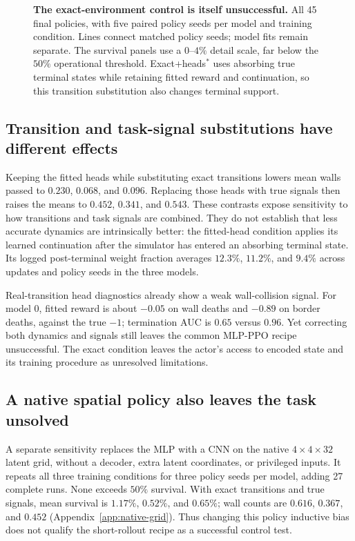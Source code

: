 \begin{figure}[t]
\centering
{}
\caption{\textbf{The exact-environment control is itself unsuccessful.} All 45 final policies,
with five paired policy seeds per model and training condition. Lines connect matched policy seeds;
model fits remain separate. The survival panels use a $0$--$4\%$ detail scale, far below the $50\%$
operational threshold. Exact+heads$^*$ uses absorbing true terminal states while retaining fitted
reward and continuation, so this transition substitution also changes terminal support.}
\label{fig:matched-control}
\end{figure}

\subsection{Transition and task-signal substitutions have different effects}
\label{sec:results-mean}

Keeping the fitted heads while substituting exact transitions lowers mean walls passed to $0.230$,
$0.068$, and $0.096$. Replacing those heads with true signals then raises the means to $0.452$,
$0.341$, and $0.543$. These contrasts expose sensitivity to how transitions and task signals are
combined. They do not establish that less accurate dynamics are intrinsically better: the fitted-head
condition applies its learned continuation after the simulator has entered an absorbing terminal state.
Its logged post-terminal weight fraction averages $12.3\%$, $11.2\%$, and $9.4\%$ across updates and
policy seeds in the three models.

Real-transition head diagnostics already show a weak wall-collision signal. For model 0, fitted
reward is about $-0.05$ on wall deaths and $-0.89$ on border deaths, against the true $-1$;
termination AUC is $0.65$ versus $0.96$. Yet correcting both dynamics and signals still leaves the
common MLP-PPO recipe unsuccessful. The exact condition leaves the actor's access to encoded state and its training procedure as
unresolved limitations.

\subsection{A native spatial policy also leaves the task unsolved}
\label{sec:native-grid}
A separate sensitivity replaces the MLP with a CNN on the native $4\times4\times32$ latent grid,
without a decoder, extra latent coordinates, or privileged inputs. It repeats all three training
conditions for three policy seeds per model, adding 27 complete runs. None exceeds $50\%$ survival.
With exact transitions and true signals, mean survival is $1.17\%$, $0.52\%$, and $0.65\%$;
wall counts are $0.616$, $0.367$, and $0.452$ (Appendix~\ref{app:native-grid}). Thus changing this
policy inductive bias does not qualify the short-rollout recipe as a successful control test.

